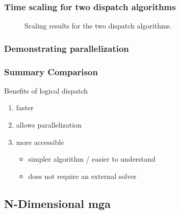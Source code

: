 \begin{frame}
    \frametitle{Time scaling for two dispatch algorithms}

    \begin{figure}
        \centering
        \resizebox{0.75\columnwidth}{!}{}
        \caption{Scaling results for the two dispatch algorithms. }
        \label{fig:time-scaling}
    \end{figure}
    
\end{frame}


\begin{frame}
    \frametitle{Demonstrating parallelization}

    \begin{figure}
        \centering
        \resizebox{0.75\columnwidth}{!}{}
        \caption{}
        \label{fig:parallel}
    \end{figure}
\end{frame}

\begin{frame}
    \frametitle{Summary Comparison}

    Benefits of logical dispatch

    \begin{enumerate}
        \item faster
        \item allows parallelization
        \item more accessible
        \begin{itemize}
            \item simpler algorithm / easier to understand
            \item does not require an external solver
        \end{itemize}
    \end{enumerate}

    
    
\end{frame}


\subsection{N-Dimensional \gls{mga}}

